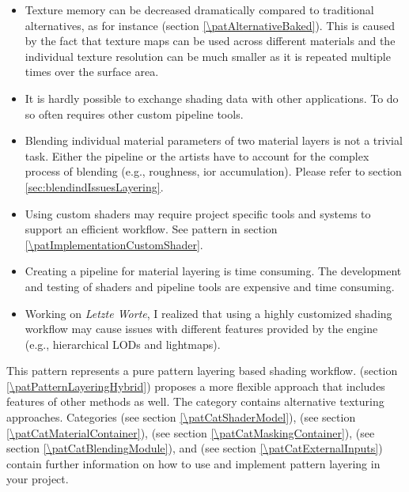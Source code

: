 \begin{description}
\begin{description}
\begin{itemize}
				\item Texture memory can be decreased dramatically compared to traditional alternatives, as for instance \emph{\patAlternativeBaked} (section \ref{\patAlternativeBaked}). This is caused by the fact that texture maps can be used across different materials and the individual texture resolution can be much smaller as it is repeated multiple times over the surface area. 
			\end{itemize}
			\item[\pipeline:]\hfill
			\begin{itemize}\mynobreakpar
				\item It is hardly possible to exchange shading data with other applications. To do so often requires other custom pipeline tools.
				\item Blending individual material parameters of two material layers is not a trivial task. Either the
				pipeline or the artists have to account for the complex process of blending (e.g., roughness, ior accumulation). Please refer to section \ref{sec:blendindIssuesLayering}.				
				\item Using custom shaders may require project specific tools and systems to support an efficient workflow. See pattern \emph{\patImplementationCustomShader} in section \ref{\patImplementationCustomShader}.
				\item Creating a pipeline for material layering is time consuming. The development and testing of shaders and pipeline tools are expensive and time consuming. 
				\item Working on \emph{Letzte Worte}, I realized that using a highly customized shading workflow may cause issues with different features provided by the engine (e.g., hierarchical LODs and lightmaps).
			\end{itemize}
		\end{description}

	\item[\patRelations:] This pattern represents a pure pattern layering based shading workflow. \emph{\patPatternLayeringHybrid} (section \ref{\patPatternLayeringHybrid}) proposes a more flexible approach that includes features of other methods as well. The category \emph{\patCatAlternatives} contains alternative texturing approaches. Categories \emph{\patCatShaderModel} (see section \ref{\patCatShaderModel}), \emph{\patCatMaterialContainer} (see section \ref{\patCatMaterialContainer}), \emph{\patCatMaskingContainer} (see section \ref{\patCatMaskingContainer}),
	\emph{\patCatBlendingModule} (see section \ref{\patCatBlendingModule}),
	 and \emph{\patCatExternalInputs} (see section \ref{\patCatExternalInputs}) contain further information on how to use and implement pattern layering in your project.	
\end{description}	


